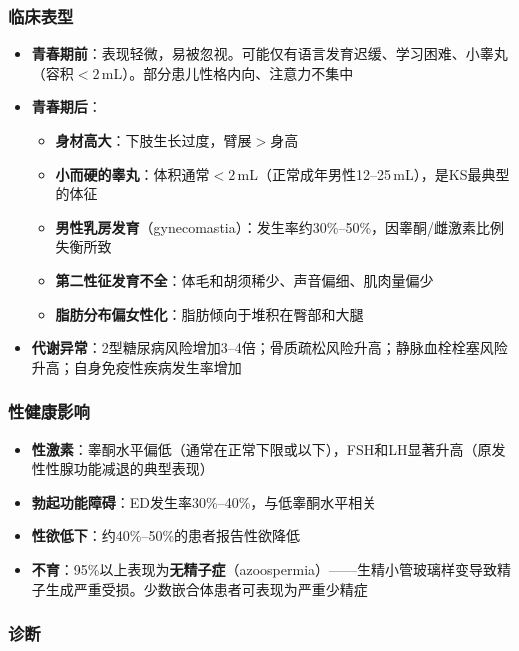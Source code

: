 \subsubsection{临床表型}

\begin{itemize}[leftmargin=2cm]
	\item \textbf{青春期前}：表现轻微，易被忽视。可能仅有语言发育迟缓、学习困难、小睾丸（容积$<2\,$mL）。部分患儿性格内向、注意力不集中
	\item \textbf{青春期后}：
	\begin{itemize}
		\item \textbf{身材高大}：下肢生长过度，臂展$>$身高
		\item \textbf{小而硬的睾丸}：体积通常$<2\,$mL（正常成年男性12--25\,mL），是KS最典型的体征
		\item \textbf{男性乳房发育}（gynecomastia）：发生率约30\%--50\%，因睾酮/雌激素比例失衡所致
		\item \textbf{第二性征发育不全}：体毛和胡须稀少、声音偏细、肌肉量偏少
		\item \textbf{脂肪分布偏女性化}：脂肪倾向于堆积在臀部和大腿
	\end{itemize}
	\item \textbf{代谢异常}：2型糖尿病风险增加3--4倍；骨质疏松风险升高；静脉血栓栓塞风险升高；自身免疫性疾病发生率增加
\end{itemize}

\subsubsection{性健康影响}

\begin{itemize}[leftmargin=2cm]
	\item \textbf{性激素}：睾酮水平偏低（通常在正常下限或以下），FSH和LH显著升高（原发性性腺功能减退的典型表现）
	\item \textbf{勃起功能障碍}：ED发生率30\%--40\%，与低睾酮水平相关
	\item \textbf{性欲低下}：约40\%--50\%的患者报告性欲降低
	\item \textbf{不育}：95\%以上表现为\textbf{无精子症}（azoospermia）——生精小管玻璃样变导致精子生成严重受损。少数嵌合体患者可表现为严重少精症
\end{itemize}

\subsubsection{诊断}

